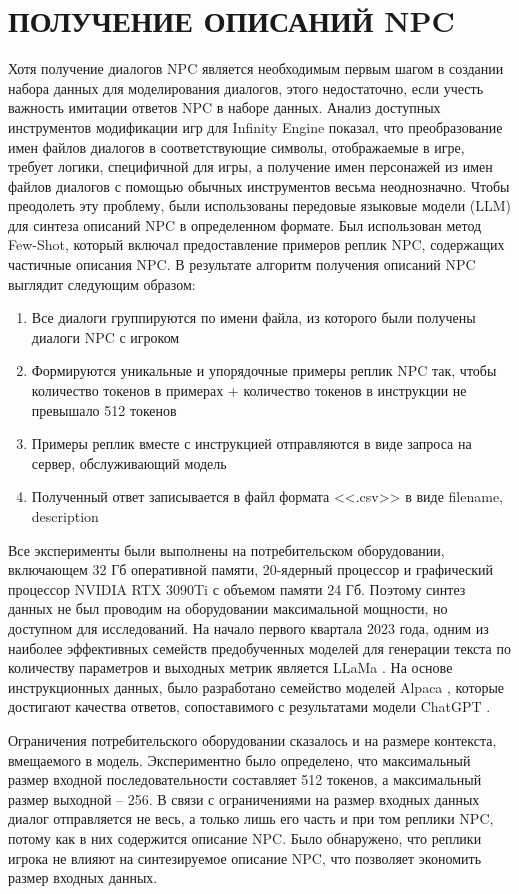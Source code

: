\section{ПОЛУЧЕНИЕ ОПИСАНИЙ NPC}

Хотя получение диалогов NPC является необходимым первым шагом в создании набора данных для моделирования диалогов, этого недостаточно, если учесть важность имитации ответов NPC в наборе данных. Анализ доступных инструментов модификации игр для Infinity Engine показал, что преобразование имен файлов диалогов в соответствующие символы, отображаемые в игре, требует логики, специфичной для игры, а получение имен персонажей из имен файлов диалогов с помощью обычных инструментов весьма неоднозначно. Чтобы преодолеть эту проблему, были использованы передовые языковые модели (LLM) для синтеза описаний NPC в определенном формате. Был использован метод Few-Shot, который включал предоставление примеров реплик NPC, содержащих частичные описания NPC. В результате алгоритм получения описаний NPC выглядит следующим образом:
\begin{enumerate}
  \item Все диалоги группируются по имени файла, из которого были получены диалоги NPC с игроком
  \item Формируются уникальные и упорядочные примеры реплик NPC так, чтобы количество токенов в примерах + количество токенов в инструкции не превышало 512 токенов
  \item Примеры реплик вместе с инструкцией отправляются в виде запроса на сервер, обслуживающий модель
  \item Полученный ответ записывается в файл формата <<.csv>> в виде filename, description
\end{enumerate}

Все эксперименты были выполнены на потребительском оборудовании, включающем 32 Гб оперативной памяти, 20-ядерный процессор и графический процессор NVIDIA RTX 3090Ti с объемом памяти 24 Гб. Поэтому синтез данных не был проводим на оборудовании максимальной мощности, но доступном для исследований. На начало первого квартала 2023 года, одним из наиболее эффективных семейств предобученных моделей для генерации текста по количеству параметров и выходных метрик является LLaMa \cite{bib1}. На основе инструкционных данных, было разработано семейство моделей Alpaca \cite{bib2}, которые достигают качества ответов, сопоставимого с результатами модели ChatGPT \cite{bib3}.

Ограничения потребительского оборудовании сказалось и на размере контекста, вмещаемого в модель. Экспериментно было определено, что максимальный размер входной последовательности составляет 512 токенов, а максимальный размер выходной -- 256. В связи с ограничениями на размер входных данных диалог отправляется не весь, а только лишь его часть и при том реплики NPC, потому как в них содержится описание NPC. Было обнаружено, что реплики игрока не влияют на синтезируемое описание NPC, что позволяет экономить размер входных данных. 

